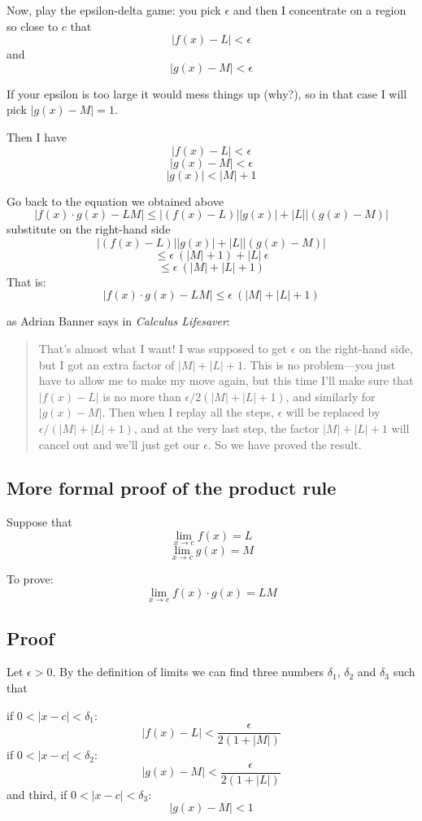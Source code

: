 \documentclass[11pt, oneside]{article}
\begin{document}
Now, play the epsilon-delta game:  you pick $\epsilon$ and then I concentrate on a region so close to $c$ that
\[ |f(x) - L | < \epsilon \]
and
\[ |g(x) - M | < \epsilon \]

If your epsilon is too large it would mess things up (why?), so in that case I will pick $|g(x) - M| = 1$.

Then I have
\[ |f(x) - L | < \epsilon \]
\[ |g(x) - M | < \epsilon \]
\[ |g(x)| < |M| + 1 \]

Go back to the equation we obtained above
\[ |f(x) \cdot g(x) - LM| \le |(f(x) - L) | | g(x)| + | L | | (g(x) - M )| \]
substitute on the right-hand side
\[ |(f(x) - L) | | g(x)| + | L | | (g(x) - M )| \]
\[ \le \epsilon \ (|M| + 1) + | L | \ \epsilon \]
\[ \le \epsilon \ (|M| + |L| + 1) \]
That is:
\[ |f(x) \cdot g(x) - LM| \le \epsilon \ (|M| + |L| + 1) \]

as Adrian Banner says in \emph{Calculus Lifesaver}:

\begin{quote}
That's almost what I want!  I was supposed to get $\epsilon$ on the right-hand side, but I got an extra factor of $|M| + |L| + 1$.  This is no problem---you just have to allow me to make my move again, but this time I'll make sure that $|f(x) - L|$ is no more than $\epsilon/2(|M| + |L| + 1)$, and similarly for $|g(x) - M|$.  Then when I replay all the steps, $\epsilon$ will be replaced by $\epsilon/(|M| + |L| + 1)$, and at the very last step, the factor $|M| + |L| + 1$ will cancel out and we'll just get our $\epsilon$.  So we have proved the result.
\end{quote}

\subsection*{More formal proof of the product rule}

Suppose that 
\[ \lim_{x \rightarrow c} f(x) = L \]
\[ \lim_{x \rightarrow c} g(x) = M \]

To prove:
\[ \lim_{x \rightarrow c} f(x) \cdot g(x) = LM \]

\subsection*{Proof}
Let $\epsilon > 0$.  By the definition of limits we can find three numbers $\delta_1$, $\delta_2$ and $\delta_3$ such that

if $0 < |x - c| < \delta_1$:
\[ |f(x) - L| < \frac{\epsilon}{2(1 + |M|)} \]
if $0 < |x - c| < \delta_2$:
\[ |g(x) - M| < \frac{\epsilon}{2(1 + |L|)} \]
and third, if $0 < |x - c| < \delta_3$:
\[ |g(x) - M| < 1 \]
\end{document}

